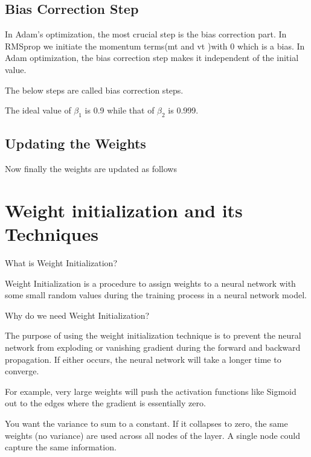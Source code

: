 	\subsection{Bias Correction Step}
	\begin{bulletedlist}
		\item In Adam's optimization, the most crucial step is the bias correction part.  In RMSprop we initiate the momentum terms(mt and vt )with 0 which is a bias. In Adam optimization, the bias correction step makes it independent of the initial value.
		\item The below steps are called bias correction steps.
		\item The ideal value of $\beta_1$ is 0.9 while that of $\beta_2$ is 0.999.
	\end{bulletedlist}

	\subsection{Updating the Weights}
Now finally the weights are updated as follows

	\section{Weight initialization and its Techniques}

What is Weight Initialization?
	\begin{bulletedlist}
		\item Weight Initialization is a procedure to assign weights to a neural network with some small random values during the training process in a neural network model.
	\end{bulletedlist}

\vspace{\baselineskip}
\noindent Why do we need Weight Initialization?
	\begin{bulletedlist}
		\item The purpose of using the weight initialization technique is to prevent the neural network from exploding or vanishing gradient during the forward and
backward propagation. If either occurs, the neural network will take a longer time to converge.
		\item For example, very large weights will push the activation functions like Sigmoid out to the edges where the gradient is essentially zero.
		\item You want the variance to sum to a constant.  If it collapses to zero, the same weights (no variance) are used across all nodes of the layer.  A single node could capture the same information.
	\end{bulletedlist}


